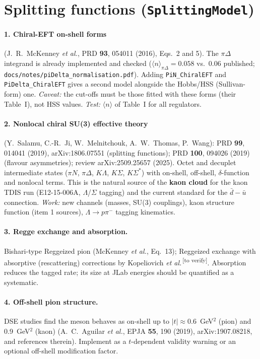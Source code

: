 \documentclass[11pt,a4paper]{article}
\newcommand{\code}[1]{\texttt{#1}}
\newcommand{\verify}{\textsuperscript{\,[to verify]}}
\begin{document}
\section{Splitting functions (\code{SplittingModel})}

\paragraph{1. Chiral-EFT on-shell forms} (J.~R.~McKenney \textit{et al.},
PRD \textbf{93}, 054011 (2016), Eqs.~2 and 5).  The $\pi\Delta$ integrand is
already implemented and checked ($\langle n\rangle_{\pi\Delta}=0.058$ vs.\ 0.06
published; \code{docs/notes/piDelta\_normalisation.pdf}).  Adding
\code{PiN\_ChiralEFT} and \code{PiDelta\_ChiralEFT} gives a second model
alongside the Hobbs/HSS (Sullivan-form) one.  \emph{Caveat:} the cut-offs
must be those fitted with these forms (their Table~I), not HSS values.
\emph{Test:} $\langle n\rangle$ of Table~I for all regulators.

\paragraph{2. Nonlocal chiral SU(3) effective theory}
(Y.~Salamu, C.-R.~Ji, W.~Melnitchouk, A.~W.~Thomas, P.~Wang):
PRD \textbf{99}, 014041 (2019), arXiv:1806.07551 (splitting functions);
PRD \textbf{100}, 094026 (2019) (flavour asymmetries);
review arXiv:2509.25657 (2025).  Octet and decuplet intermediate states
($\pi N$, $\pi\Delta$, $K\Lambda$, $K\Sigma$, $K\Sigma^*$) with on-shell,
off-shell, $\delta$-function and nonlocal terms.  This is the natural source
of the \textbf{kaon cloud} for the kaon TDIS run (E12-15-006A, $\Lambda$/$\Sigma$
tagging) and the current standard for the $\bar d-\bar u$ connection.
\emph{Work:} new channels (masses, SU(3) couplings), kaon structure function
(item 1 sources), $\Lambda\to p\pi^-$ tagging kinematics.

\paragraph{3. Regge exchange and absorption.}  Bishari-type Reggeized pion
(McKenney \textit{et al.}, Eq.~13); Reggeized exchange with absorptive
(rescattering) corrections by Kopeliovich \textit{et al.}\verify{}.
Absorption reduces the tagged rate; its size at JLab energies should be
quantified as a systematic.

\paragraph{4. Off-shell pion structure.}  DSE studies find the meson behaves
as on-shell up to $|t|\approx0.6$~GeV$^2$ (pion) and 0.9~GeV$^2$ (kaon)
(A.~C.~Aguilar \textit{et al.}, EPJA \textbf{55}, 190 (2019),
arXiv:1907.08218, and references therein).  Implement as a $t$-dependent
validity warning or an optional off-shell modification factor.
\end{document}
